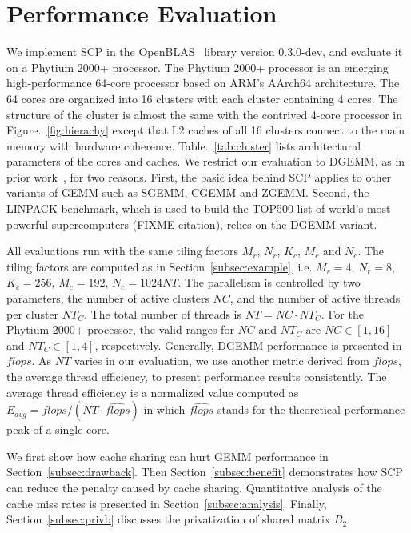 \section{Performance Evaluation}\label{sec:evaluation}

We implement SCP in the OpenBLAS~\cite{openblas} library version 0.3.0-dev,
and evaluate it on a Phytium 2000+ processor.
The Phytium 2000+ processor is an emerging high-performance
64-core processor based on ARM's AArch64 architecture.
The 64 cores are organized into 16 clusters with each
cluster containing 4 cores.
The structure of the cluster is almost the same with
the contrived 4-core processor in Figure.~\ref{fig:hierachy}
except that L2 caches of all 16 clusters connect to the main memory
with hardware coherence.
Table.~\ref{tab:cluster} lists architectural parameters of the cores and caches.
We restrict our evaluation to DGEMM,
as in prior work~\cite{blispar,augem,poetmicro}, for two reasons.
First, the basic idea behind SCP applies to other
variants of GEMM such as SGEMM, CGEMM and ZGEMM.
Second, the LINPACK benchmark, which is used to build the
TOP500 list of world's most powerful supercomputers (FIXME citation),
relies on the DGEMM variant.

All evaluations run with the same tiling factors
$M_r$, $N_r$, $K_c$, $M_c$ and $N_c$.
The tiling factors are computed as in Section~\ref{subsec:example},
i.e. $M_r = 4$, $N_r = 8$, $K_c = 256$, $M_c = 192$, $N_c = 1024NT$.
The parallelism is controlled by two parameters,
the number of active clusters $NC$,
and the number of active threads per cluster $NT_C$.
The total number of threads is $NT = NC \cdot NT_C$.
For the Phytium 2000+ processor, the valid ranges for $NC$ and $NT_C$
are $NC \in [1, 16]$ and $NT_C \in [1, 4]$, respectively.
Generally, DGEMM performance is presented in $flops$.
As $NT$ varies in our evaluation,
we use another metric derived from $flops$,
the average thread efficiency,
to present performance results consistently.
The average thread efficiency is a normalized value computed as
$E_{avg} = flops / (NT \cdot \widehat{flops})$
in which $\widehat{flops}$ stands for the theoretical performance peak of a single core.

We first show how cache sharing can hurt GEMM performance
in Section~\ref{subsec:drawback}.
Then Section~\ref{subsec:benefit} demonstrates how SCP can reduce
the penalty caused by cache sharing.
Quantitative analysis of the cache miss rates
is presented in Section~\ref{subsec:analysis}.
Finally, Section~\ref{subsec:privb} discusses
the privatization of shared matrix $B_2$.

